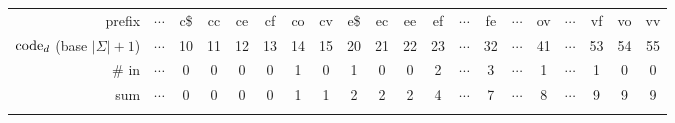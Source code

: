 \begin{tabular}{!{\color{white}\vrule} r !{\color{white}\vrule} c !{\color{white}\vrule} c !{\color{white}\vrule} c !{\color{white}\vrule} c !{\color{white}\vrule} c !{\color{white}\vrule} c !{\color{white}\vrule} c !{\color{white}\vrule} c !{\color{white}\vrule} c !{\color{white}\vrule} c !{\color{white}\vrule} c !{\color{white}\vrule} c !{\color{white}\vrule} c !{\color{white}\vrule} c !{\color{white}\vrule} c !{\color{white}\vrule} c !{\color{white}\vrule} c !{\color{white}\vrule} c !{\color{white}\vrule} c !{\color{white}\vrule}}
	\hline
	prefix & \(\cdots\) & c\$ & cc & ce & cf & co & cv & e\$ & ec & ee & ef & \(\cdots\) & fe & \(\cdots\) & ov & \(\cdots\) & vf & vo & vv \\
	\hline
	\hline
	\(\textup{code}_d\) (base \(|\Sigma| + 1\)) & \(\cdots\) & 10 & 11 & 12 & 13 & 14 & 15 & 20 & 21 & 22 & 23 & \(\cdots\) & 32 & \(\cdots\) & 41 & \(\cdots\) & 53 & 54 & 55 \\
	\hline
	\# in  & \(\cdots\) & 0 & 0 & 0 & 0 & 1 & 0 & 1 & 0 & 0 & 2 & \(\cdots\) & 3 & \(\cdots\) & 1 & \(\cdots\) & 1 & 0 & 0 \\
	\hline
	sum & \(\cdots\) & 0 & 0 & 0 & 0 & 1 & 1 & 2 & 2 & 2 & 4 & \(\cdots\) & 7 & \(\cdots\) & 8 & \(\cdots\) & 9 & 9 & 9 \\
	\hline
\end{tabular}
